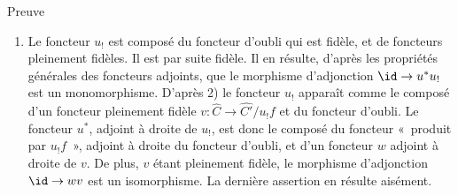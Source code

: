 \begin{enonce*}[remark]{Preuve}
\begin{enumerate}
\item Le foncteur $u_{!}$ est composé du foncteur d'oubli qui est
  fidèle, et de foncteurs pleinement fidèles. Il est par suite
  fidèle. Il en résulte, d'après les propriétés
  générales des foncteurs adjoints, que le morphisme d'adjonction
  $\id\rightarrow u^\ast u_{!}$ est un monomorphisme. D'après 2) le
  foncteur $u_{!}$ apparaît comme le composé d'un foncteur
  pleinement fidèle $v:\widehat{C}\to
  \widehat{C'}/u_{!}f$ et du foncteur d'oubli. Le
  foncteur $u^\ast$, adjoint à droite de $u_{!}$, est donc le
  composé du foncteur « produit par $u_{!}f$ », adjoint à
  droite du foncteur d'oubli, et d'un foncteur $w$ adjoint à droite
  de $v$. De plus, $v$ étant pleinement fidèle, le morphisme
  d'adjonction $\id\rightarrow wv$ est un isomorphisme. La dernière
  assertion en résulte aisément.
\end{enumerate}
\end{enonce*}

